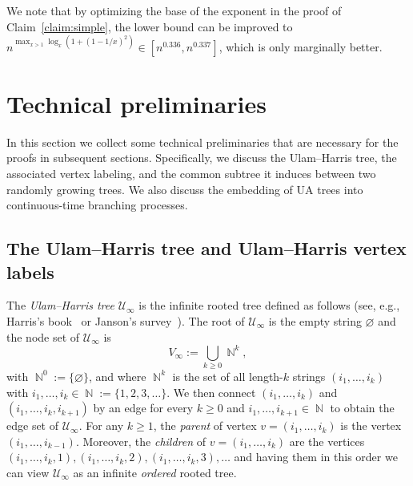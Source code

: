 \documentclass[11pt]{article}
\numberwithin{equation}{section}
\DeclareMathOperator{\N}{\mathbb{N}} %
\def\cU{{\mathcal U}}
\theoremstyle{definition}
\begin{document}
We note that by optimizing the base of the exponent in the proof of Claim~\ref{claim:simple}, the lower bound can be improved to 
$n^{\max_{x > 1} \log_{x}(1+(1-1/x)^{2})} 
\in [n^{0.336},n^{0.337}]$, 
which is only marginally better. 


\section{Technical preliminaries} \label{sec:prelim} %

In this section we collect some technical preliminaries that are necessary for the proofs in subsequent sections. 
Specifically, we discuss the Ulam--Harris tree, the associated vertex labeling, and the common subtree it induces between two randomly growing trees. 
We also discuss the embedding of UA trees into continuous-time branching processes. 

\subsection{The Ulam--Harris tree and Ulam--Harris vertex labels} \label{sec:UlamHarris}

The \emph{Ulam--Harris tree} $\cU_{\infty}$ is the infinite rooted tree defined as follows (see, e.g., Harris's book~\cite[Chapter~VI]{harris_book} or Janson's survey~\cite[Section~6]{janson2012simply}).
The root of $\cU_{\infty}$ is the empty string $\varnothing$ and the node set of $\cU_{\infty}$ is 
\[
V_{\infty} := \bigcup_{k \geq 0} \N^{k},
\]
with $\N^0 := \{\varnothing\}$, and where $\N^{k}$ is the set of all length-$k$ strings $(i_{1}, \ldots, i_{k})$ with $i_{1}, \ldots, i_{k} \in \N := \{ 1, 2, 3, \ldots \}$. 
We then connect $(i_{1}, \ldots, i_{k})$ and $(i_{1}, \ldots, i_{k}, i_{k+1})$ by an edge for every $k \geq 0$ and $i_{1}, \ldots, i_{k+1} \in \N$ to obtain the edge set of $\cU_{\infty}$. 
For any $k \geq 1$, the \emph{parent} of vertex $v = (i_{1}, \ldots, i_{k})$ is the vertex $(i_{1}, \ldots, i_{k-1})$. 
Moreover, the \emph{children} of $v = (i_{1}, \ldots, i_{k})$ are the vertices $(i_{1}, \ldots, i_{k}, 1), (i_{1}, \ldots, i_{k}, 2), (i_{1}, \ldots, i_{k}, 3), \ldots$ 
and having them in this order we can view $\cU_{\infty}$ as an infinite \emph{ordered} rooted tree.
\end{document}
